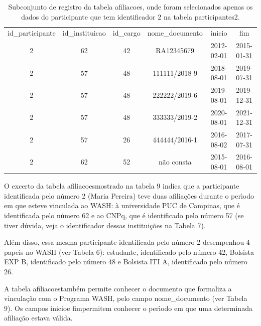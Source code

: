 \documentclass[
12pt,		%
openright,	%
twoside,  %
a4paper,			%
chapter=TITLE,		%
english,			%
french,				%
spanish,			%
brazil				%
]{USPSC-classe/USPSC}
\begin{document}
\begin{table}[htb]
\tiny
\caption{\label{e6120545268b93238330297571c4756e7c97df1a}Subconjunto de registro da tabela afiliacoes, onde foram selecionados apenas os dados do participante que tem identificador 2 na tabela participantes2.}

\centering
\begin{tabular}{|c|c|c|c|c|c|}
\hline
id\_participante  &  id\_instituicao  &  id\_cargo  &  nome\_documento  &  inicio      &  fim \\
              2  &              62  &        42  &  RA12345679      &  2012-02-01  &  2015-01-31  \\
              2  &              57  &        48  &  111111/2018-9   &  2018-08-01  &  2019-07-31  \\
              2  &              57  &        48  &  222222/2019-6   &  2019-08-01  &  2019-12-31  \\
              2  &              57  &        48  &  333333/2019-2   &  2020-08-01  &  2021-12-31  \\
              2  &              57  &        26  &  444444/2016-1   &  2016-08-02  &  2017-07-31  \\
              2  &              62  &        52  &  n\~ao consta      &  2015-08-01  &  2016-08-01 \\
\hline
\end{tabular}
\end{table}


O excerto da tabela \textquotedbl afiliacoes\textquotedbl  mostrado na tabela 9 indica que a participante identificada pelo n\'umero 2 (Maria Pereira)  teve duas afilia\c{c}\~oes durante o per\'{\i}odo em que esteve vinculada ao WASH: \`a universidade PUC de Campinas, que \'e identificada pelo n\'umero 62 e ao CNPq, que \'e identificado pelo n\'umero 57 (se tiver d\'uvida, veja o identificador dessas institui\c{c}\~oes na Tabela 7).








Al\'em disso, essa mesma participante identificada pelo n\'umero 2 desempenhou 4 papeis no WASH (ver Tabela 6): estudante, identificado pelo n\'umero 42, Bolsista EXP B, identificado pelo n\'umero 48 e Bolsista ITI A, identificado pelo n\'umero 26.








A tabela \textquotedbl afiliacoes\textquotedbl  tamb\'em permite conhecer o documento que formaliza a vincula\c{c}\~ao com o Programa WASH, pelo campo nome\_documento (ver Tabela 9). Os campos \textquotedbl inicio\textquotedbl  e \textquotedbl fim\textquotedbl  permitem conhecer o per\'{\i}odo em que uma determinada afilia\c{c}\~ao estava v\'alida.
\end{document}
